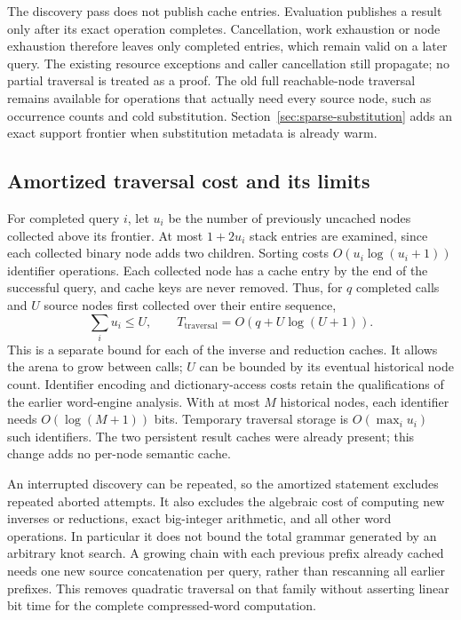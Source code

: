 The discovery pass does not publish cache entries. Evaluation publishes a
result only after its exact operation completes. Cancellation, work exhaustion
or node exhaustion therefore leaves only completed entries, which remain
valid on a later query. The existing resource exceptions and caller
cancellation still propagate; no partial traversal is treated as a proof.
The old full reachable-node traversal remains available for operations that
actually need every source node, such as occurrence counts and cold
substitution. Section~\ref{sec:sparse-substitution} adds an exact support
frontier when substitution metadata is already warm.

\subsection{Amortized traversal cost and its limits}

For completed query $i$, let $u_i$ be the number of previously uncached nodes
collected above its frontier. At most $1+2u_i$ stack entries are examined,
since each collected binary node adds two children. Sorting costs
$O(u_i\log(u_i+1))$ identifier operations. Each collected node has a cache
entry by the end of the successful query, and cache keys are never removed.
Thus, for $q$ completed calls and $U$ source nodes first collected over their
entire sequence,
\[
 \sum_i u_i\le U,\qquad
 T_{\mathrm{traversal}}=O(q+U\log(U+1)).
\]
This is a separate bound for each of the inverse and reduction caches. It
allows the arena to grow between calls; $U$ can be bounded by its eventual
historical node count. Identifier encoding and dictionary-access costs retain
the qualifications of the earlier word-engine analysis. With at most $M$ historical nodes, each identifier needs
$O(\log(M+1))$ bits. Temporary traversal storage is
$O(\max_i u_i)$ such identifiers. The two persistent result caches were
already present; this change adds no per-node semantic cache.

An interrupted discovery can be repeated, so the amortized statement excludes
repeated aborted attempts. It also excludes the algebraic cost of computing
new inverses or reductions, exact big-integer arithmetic, and all other word
operations. In particular it does not bound the total grammar generated by
an arbitrary knot search. A growing chain with each previous prefix already
cached needs one new source concatenation per query, rather than rescanning
all earlier prefixes. This removes quadratic traversal on that family without
asserting linear bit time for the complete compressed-word computation.


